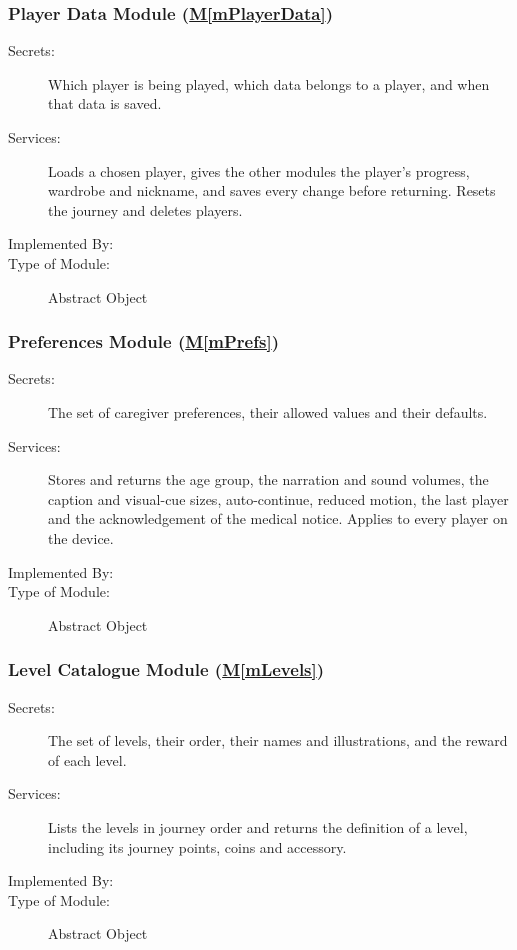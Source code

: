 \documentclass[12pt, titlepage]{article}
\newcommand{\mref}[1]{\hyperref[#1]{M\ref*{#1}}}
\begin{document}
\subsubsection{Player Data Module (\mref{mPlayerData})}

\begin{description}
\item[Secrets:] Which player is being played, which data belongs to a player,
  and when that data is saved.
\item[Services:] Loads a chosen player, gives the other modules the player's
  progress, wardrobe and nickname, and saves every change before returning.
  Resets the journey and deletes players.
\item[Implemented By:] \progname{}
\item[Type of Module:] Abstract Object
\end{description}

\subsubsection{Preferences Module (\mref{mPrefs})}

\begin{description}
\item[Secrets:] The set of caregiver preferences, their allowed values and
  their defaults.
\item[Services:] Stores and returns the age group, the narration and sound
  volumes, the caption and visual-cue sizes, auto-continue, reduced motion, the
  last player and the acknowledgement of the medical notice. Applies to every
  player on the device.
\item[Implemented By:] \progname{}
\item[Type of Module:] Abstract Object
\end{description}

\subsubsection{Level Catalogue Module (\mref{mLevels})}

\begin{description}
\item[Secrets:] The set of levels, their order, their names and illustrations,
  and the reward of each level.
\item[Services:] Lists the levels in journey order and returns the definition
  of a level, including its journey points, coins and accessory.
\item[Implemented By:] \progname{}
\item[Type of Module:] Abstract Object
\end{description}
\end{document}

